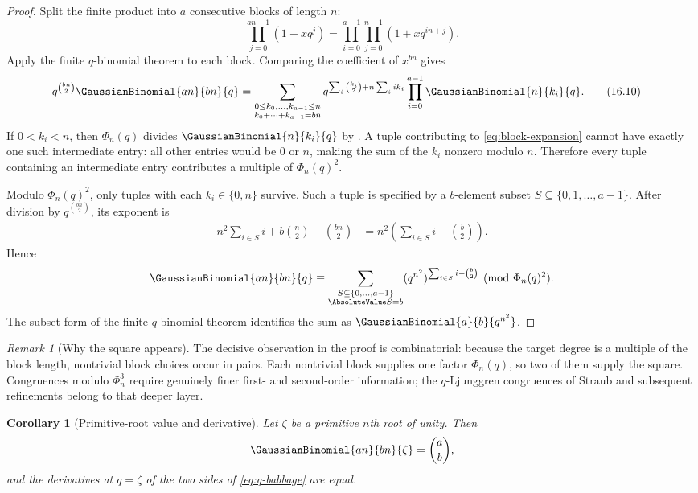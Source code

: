 \documentclass[11pt,a4paper,oneside,openany]{book}
\newtheorem{corollary}[corollary]{Corollary}
\theoremstyle{definition}
\theoremstyle{remark}
\newtheorem{remark}[remark]{Remark}
\begin{document}
\begin{proof}
Split the finite product into $a$ consecutive blocks of length $n$:
\[
 \prod_{j=0}^{an-1}(1+xq^j)
 =\prod_{i=0}^{a-1}\prod_{j=0}^{n-1}(1+xq^{in+j}).
\]
Apply the finite $q$-binomial theorem to each block.  Comparing the coefficient of $x^{bn}$ gives
\begin{align}
 q^{\binom{bn}{2}}\GaussianBinomial{an}{bn}{q}
 &=\sum_{\substack{0\le k_0,\ldots,k_{a-1}\le n\\
                    k_0+\cdots+k_{a-1}=bn}}
 q^{\sum_i\binom{k_i}{2}+n\sum_i i k_i}
 \prod_{i=0}^{a-1}\GaussianBinomial{n}{k_i}{q}.
 \tag{16.10}\label{eq:block-expansion}
\end{align}
If $0<k_i<n$, then $\Phi_n(q)$ divides $\GaussianBinomial{n}{k_i}{q}$ by .  A tuple contributing to \eqref{eq:block-expansion} cannot have exactly one such intermediate entry: all other entries would be $0$ or $n$, making the sum of the $k_i$ nonzero modulo $n$.  Therefore every tuple containing an intermediate entry contributes a multiple of $\Phi_n(q)^2$.

Modulo $\Phi_n(q)^2$, only tuples with each $k_i\in\{0,n\}$ survive.  Such a tuple is specified by a $b$-element subset $S\subseteq\{0,1,\ldots,a-1\}$.  After division by $q^{\binom{bn}{2}}$, its exponent is
\begin{align*}
 n^2\sum_{i\in S}i+b\binom n2-\binom{bn}{2}
 &=n^2\left(\sum_{i\in S}i-\binom b2\right).
\end{align*}
Hence
\[
 \GaussianBinomial{an}{bn}{q}
 \equiv
 \sum_{\substack{S\subseteq\{0,\ldots,a-1\}\\\AbsoluteValue S=b}}
 (q^{n^2})^{\sum_{i\in S}i-\binom b2}
 \pmod{\Phi_n(q)^2}.
\]
The subset form of the finite $q$-binomial theorem identifies the sum as $\GaussianBinomial{a}{b}{q^{n^2}}$.
\end{proof}

\begin{remark}[Why the square appears]
The decisive observation in the proof is combinatorial: because the target degree is a multiple of the block length, nontrivial block choices occur in pairs.  Each nontrivial block supplies one factor $\Phi_n(q)$, so two of them supply the square.  Congruences modulo $\Phi_n^3$ require genuinely finer first- and second-order information; the $q$-Ljunggren congruences of Straub and subsequent refinements belong to that deeper layer.
\end{remark}

\begin{corollary}[Primitive-root value and derivative]\label{cor:babbage-derivative}
Let $\zeta$ be a primitive $n$th root of unity.  Then
\[
 \GaussianBinomial{an}{bn}{\zeta}=\binom ab,
\]
and the derivatives at $q=\zeta$ of the two sides of \eqref{eq:q-babbage} are equal.
\end{corollary}
\end{document}
